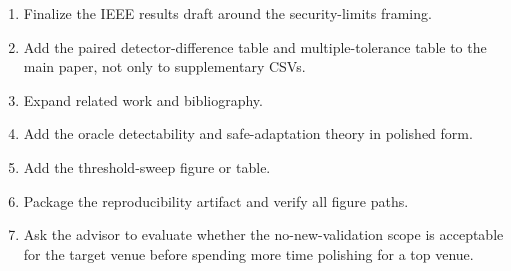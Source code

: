 \begin{enumerate}
    \item Finalize the IEEE results draft around the security-limits framing.

    \item Add the paired detector-difference table and multiple-tolerance
    table to the main paper, not only to supplementary CSVs.

    \item Expand related work and bibliography.

    \item Add the oracle detectability and safe-adaptation theory in polished
    form.

    \item Add the threshold-sweep figure or table.

    \item Package the reproducibility artifact and verify all figure paths.

    \item Ask the advisor to evaluate whether the no-new-validation scope is
    acceptable for the target venue before spending more time polishing for a
    top venue.
\end{enumerate}
